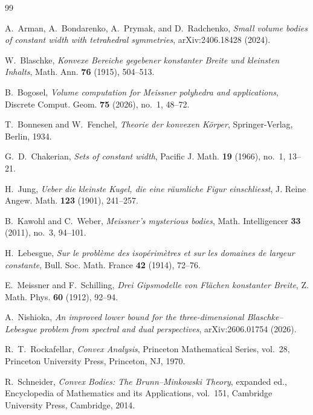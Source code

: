 \documentclass[11pt,reqno]{amsart}
\numberwithin{equation}{section}
\theoremstyle{definition}
\theoremstyle{remark}
\begin{document}
\begin{thebibliography}{99}

A.~Arman, A.~Bondarenko, A.~Prymak, and D.~Radchenko,
\emph{Small volume bodies of constant width with tetrahedral symmetries},
arXiv:2406.18428 (2024).

W.~Blaschke,
\emph{Konvexe Bereiche gegebener konstanter Breite und kleinsten Inhalts},
Math. Ann. \textbf{76} (1915), 504--513.

B.~Bogosel,
\emph{Volume computation for Meissner polyhedra and applications},
Discrete Comput. Geom. \textbf{75} (2026), no.~1, 48--72.

T.~Bonnesen and W.~Fenchel,
\emph{Theorie der konvexen K\"orper},
Springer-Verlag, Berlin, 1934.

G.~D.~Chakerian,
\emph{Sets of constant width},
Pacific J. Math. \textbf{19} (1966), no.~1, 13--21.

H.~Jung,
\emph{Ueber die kleinste Kugel, die eine r\"aumliche Figur einschliesst},
J. Reine Angew. Math. \textbf{123} (1901), 241--257.

B.~Kawohl and C.~Weber,
\emph{Meissner's mysterious bodies},
Math. Intelligencer \textbf{33} (2011), no.~3, 94--101.

H.~Lebesgue,
\emph{Sur le probl\`eme des isop\'erim\`etres et sur les domaines de largeur constante},
Bull. Soc. Math. France \textbf{42} (1914), 72--76.

E.~Meissner and F.~Schilling,
\emph{Drei Gipsmodelle von Fl\"achen konstanter Breite},
Z. Math. Phys. \textbf{60} (1912), 92--94.

A.~Nishioka,
\emph{An improved lower bound for the three-dimensional Blaschke--Lebesgue problem from spectral and dual perspectives},
arXiv:2606.01754 (2026).

R.~T.~Rockafellar,
\emph{Convex Analysis},
Princeton Mathematical Series, vol.~28,
Princeton University Press, Princeton, NJ, 1970.

R.~Schneider,
\emph{Convex Bodies: The Brunn--Minkowski Theory},
expanded ed., Encyclopedia of Mathematics and its Applications, vol.~151,
Cambridge University Press, Cambridge, 2014.

\end{thebibliography}
\end{document}
